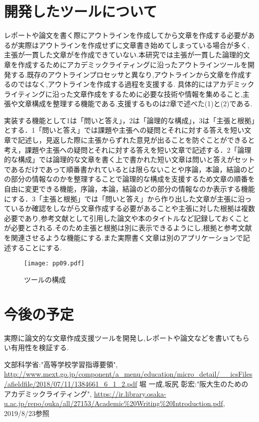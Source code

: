 \documentclass[twocolumn,10pt,a4j]{jsarticle}
\begin{document}
\section{開発したツールについて}
レポートや論文を書く際にアウトラインを作成してから文章を作成する必要があるが実際はアウトラインを作成せずに文章書き始めてしまっている場合が多く,主張が一貫した文章がを作成できていない.本研究では主張が一貫した論理的文章を作成するためにアカデミックライティングに沿ったアウトラインツールを開発する.既存のアウトラインプロセッサと異なり,アウトラインから文章を作成するのではなく,アウトラインを作成する過程を支援する.
具体的にはアカデミックライティングに沿った文章作成をするために必要な技術や情報を集めること,主張や文章構成を整理する機能である.支援するものは2章で述べた(1)と(2)である.


実装する機能として\textcircled{\scriptsize{1}}は「問いと答え」，\textcircled{\scriptsize{2}}は「論理的な構成」，\textcircled{\scriptsize{3}}は「主張と根拠」とする．\textcircled{\scriptsize{1}}「問いと答え」では課題や主張への疑問とそれに対する答えを短い文章で記述し，見返した際に主張からずれた意見が出ることを防ぐことができると考え，課題や主張への疑問とそれに対する答えを短い文章で記述する．\textcircled{\scriptsize{2}}「論理的な構成」では論理的な文章を書く上で書かれた短い文章は問いと答えがセットであるだけであって順番書かれているとは限らないことや序論，本論，結論のどの部分の情報なのかを整理することで論理的な構成を支援するため文章の順番を自由に変更できる機能，序論，本論，結論のどの部分の情報なのか表示する機能にする．\textcircled{\scriptsize{3}}「主張と根拠」では「問いと答え」から作り出した文章が主張に沿っているか確認をしながら文章作成する必要があることや主張に対した根拠は複数必要であり,参考文献として引用した論文や本のタイトルなど記録しておくことが必要とされる.そのため主張と根拠は別に表示できるようにし,根拠と参考文献を関連させるような機能にする.また実際書く文章は別のアプリケーションで記述することにする.


\begin{figure}[h]
\begin{center}
 \texttt{[image: pp09.pdf]}
\end{center}
 \caption{ツールの構成}
 \label{fig:教科書}
\end{figure}


\section{今後の予定}
実際に論文的な文章作成支援ツールを開発し,レポートや論文などを書いてもらい有用性を検証する.

\begin{thebibliography}{99}
 文部科学省:"高等学校学習指導要領",
\url{http://www.mext.go.jp/component/a_menu/education/micro_detail/__icsFiles/afieldfile/2018/07/11/1384661_6_1_2.pdf}
 堀 一成,坂尻 彰宏:"阪大生のためのアカデミックライティング",
\url{https://ir.library.osaka-u.ac.jp/repo/ouka/all/27153/Academic%20Writing%20Introduction.pdf}, 2019/8/23参照


\end{thebibliography}
\end{document}
